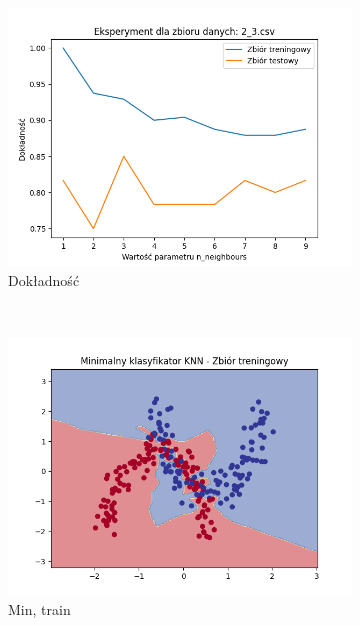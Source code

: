 \documentclass[12pt]{article}
\newcommand*{\subfigwidth}{0.24\textwidth}
\begin{document}
\begin{figure}[H]\centering
    \begin{subfigure}[t]{\subfigwidth}
        \includegraphics[width=\linewidth]{img/exp_2/knn/2_3/accuracy.png}
        \caption{Dokładność}
    \end{subfigure}
    \\
    \begin{subfigure}[t]{\subfigwidth}
        \includegraphics[width=\linewidth]{img/exp_2/knn/2_3/min/train_boundary.png}
        \caption{Min, train}
    \end{subfigure}
    \hfill
    \begin{subfigure}[t]{\subfigwidth}

\end{subfigure}
\end{figure}
\end{document}
